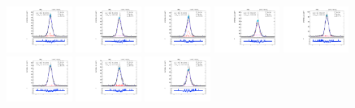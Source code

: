\begin{figure}[htb]
\includegraphics[width=0.19\textwidth]{plots/Appendix_Recoil_Fits/ZmmData_PF_13TeV_2G_bkg/pfu2fit_24.pdf}
\includegraphics[width=0.19\textwidth]{plots/Appendix_Recoil_Fits/ZmmData_PF_13TeV_2G_bkg/pfu2fit_25.pdf}
\includegraphics[width=0.19\textwidth]{plots/Appendix_Recoil_Fits/ZmmData_PF_13TeV_2G_bkg/pfu2fit_26.pdf}
\includegraphics[width=0.19\textwidth]{plots/Appendix_Recoil_Fits/ZmmData_PF_13TeV_2G_bkg/pfu2fit_27.pdf}
\includegraphics[width=0.19\textwidth]{plots/Appendix_Recoil_Fits/ZmmData_PF_13TeV_2G_bkg/pfu2fit_28.pdf}
\includegraphics[width=0.19\textwidth]{plots/Appendix_Recoil_Fits/ZmmData_PF_13TeV_2G_bkg/pfu2fit_29.pdf}
\includegraphics[width=0.19\textwidth]{plots/Appendix_Recoil_Fits/ZmmData_PF_13TeV_2G_bkg/pfu2fit_30.pdf}
\includegraphics[width=0.19\textwidth]{plots/Appendix_Recoil_Fits/ZmmData_PF_13TeV_2G_bkg/pfu2fit_31.pdf}

\end{figure}

